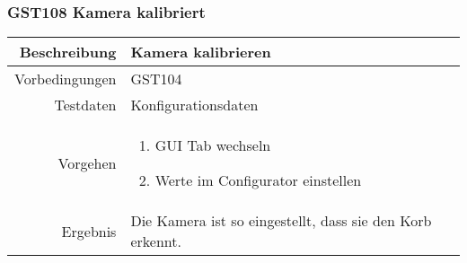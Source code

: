 \subsubsection{GST108 Kamera kalibriert}
\begin{table}[h!]
	\renewcommand{\arraystretch}{1.5}
	\begin{tabular}{|r|p{13cm}|}
		\hline Beschreibung & Kamera kalibrieren \\ 
		\hline Vorbedingungen &  GST104\\ 
		\hline Testdaten & Konfigurationsdaten \\ 
		\hline Vorgehen & 
		\begin{enumerate}
			\item GUI Tab wechseln
			\item Werte im Configurator einstellen
		\end{enumerate} \\ 
		\hline Ergebnis & Die Kamera ist so eingestellt, dass sie den Korb erkennt. \\ 
		\hline 
	\end{tabular}
\end{table}

\newpage


\clearpage



\newpage


